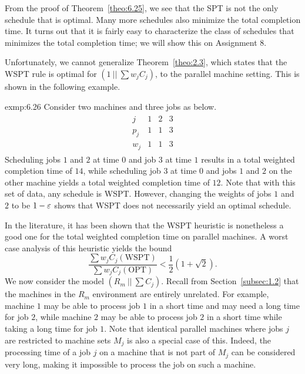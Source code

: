 From the proof of Theorem~\ref{theo:6.25}, we see that the SPT is not the only 
schedule that is optimal. Many more schedules also minimize the total 
completion time. It turns out that it is fairly easy to characterize the 
class of schedules that minimizes the total completion time; we will 
show this on Assignment 8. 

Unfortunately, we cannot generalize Theorem~\ref{theo:2.3}, which states that 
the WSPT rule is optimal for $(1~||~\sum w_j C_j)$, to the parallel 
machine setting. This is shown in the following example. 

\begin{exmp}{exmp:6.26}
    Consider two machines and three jobs as below. 
    \begin{align*}
        \begin{array}{c|ccc}
            j & 1 & 2 & 3 \\ \hline 
            p_j & 1 & 1 & 3 \\ 
            w_j & 1 & 1 & 3
        \end{array}
    \end{align*}
    Scheduling jobs $1$ and $2$ at time $0$ and job $3$ at time $1$ 
    results in a total weighted completion time of $14$, while 
    scheduling job $3$ at time $0$ and jobs $1$ and $2$ on the other machine 
    yields a total weighted completion time of $12$. Note that with this 
    set of data, any schedule is WSPT. However, changing the weights of jobs 
    $1$ and $2$ to be $1 - \varepsilon$ shows that WSPT does not 
    necessarily yield an optimal schedule. 
\end{exmp}

In the literature, it has been shown that the WSPT heuristic is nonetheless 
a good one for the total weighted completion time on parallel machines. 
A worst case analysis of this heuristic yields the bound 
\[ \frac{\sum w_j C_j(\text{WSPT})}{\sum w_j C_j(\text{OPT})} < 
\frac12 (1 + \sqrt2). \] 
We now consider the model $(R_m~||~\sum C_j)$. Recall from Section~\ref{subsec:1.2}
that the machines in the $R_m$ environment are entirely unrelated. For example, 
machine $1$ may be able to process job $1$ in a short time and may need a long 
time for job $2$, while machine $2$ may be able to process job $2$ in a 
short time while taking a long time for job $1$. Note that identical 
parallel machines where jobs $j$ are restricted to machine sets $M_j$ 
is also a special case of this. Indeed, the processing time of a job $j$ 
on a machine that is not part of $M_j$ can be considered very long, 
making it impossible to process the job on such a machine. 

